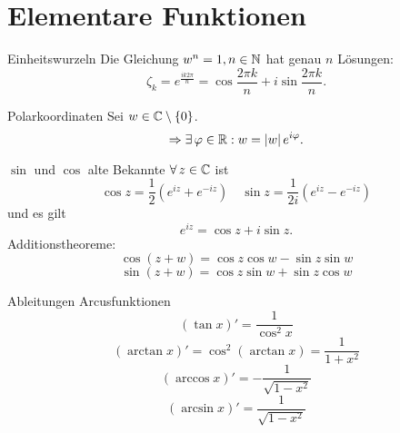 \documentclass[main.tex]{subfiles}
\begin{document}
\section*{Elementare Funktionen}

\begin{karte}{Einheitswurzeln}
    Die Gleichung \( w^n = 1, n \in \mathbb{N} \) hat 
    genau \(n\) Lösungen:
    \[ \zeta_k = e^{\frac{ik2\pi}{n}} 
    = \cos \frac{2\pi k}{n} + i \sin \frac{2\pi k}{n}. \]
\end{karte}

\begin{karte}{Polarkoordinaten}
    Sei \( w \in \mathbb{C} \setminus \{0\} \).
    \[ \Rightarrow \exists \varphi \in \R: w = \abs{w}e^{i\varphi}. \]
\end{karte}

\begin{karte}{\(\sin\) und \( \cos \) \textendash{} alte Bekannte}
    \( \forall z \in \C \) ist 
    \[ \cos z = \frac{1}{2}(e^{iz} + e^{-iz}) \quad \sin z = \frac{1}{2i}(e^{iz} - e^{-iz}) \]
    und es gilt
    \[ e^{iz} = \cos z + i \sin z. \]
    Additionstheoreme:
    \[ \cos(z+w) = \cos z \cos w - \sin z \sin w \]
    \[ \sin(z+w) = \cos z \sin w + \sin z \cos w \]
\end{karte}

\begin{karte}{Ableitungen Arcusfunktionen}
    \[ (\tan x)' = \frac{1}{\cos^2 x} \]
    \[ (\arctan x)' = \cos^2(\arctan x) = \frac{1}{1+x^2} \]
    \[ (\arccos x)' = -\frac{1}{\sqrt{1-x^2}} \]
    \[ (\arcsin x)' = \frac{1}{\sqrt{1-x^2}} \]
\end{karte}
\end{document}
